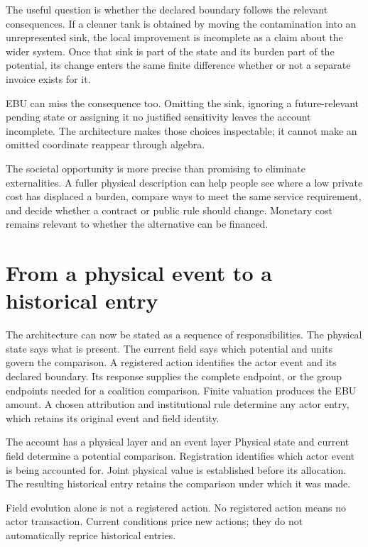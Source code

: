 The useful question is whether the declared boundary follows the relevant consequences. If a cleaner tank is obtained by moving the contamination into an unrepresented sink, the local improvement is incomplete as a claim about the wider system. Once that sink is part of the state and its burden part of the potential, its change enters the same finite difference whether or not a separate invoice exists for it.

EBU can miss the consequence too. Omitting the sink, ignoring a future-relevant pending state or assigning it no justified sensitivity leaves the account incomplete. The architecture makes those choices inspectable; it cannot make an omitted coordinate reappear through algebra.

The societal opportunity is more precise than promising to eliminate externalities. A fuller physical description can help people see where a low private cost has displaced a burden, compare ways to meet the same service requirement, and decide whether a contract or public rule should change. Monetary cost remains relevant to whether the alternative can be financed.

\section{From a physical event to a historical entry}
The architecture can now be stated as a sequence of responsibilities. The physical state says what is present. The current field says which potential and units govern the comparison. A registered action identifies the actor event and its declared boundary. Its response supplies the complete endpoint, or the group endpoints needed for a coalition comparison. Finite valuation produces the EBU amount. A chosen attribution and institutional rule determine any actor entry, which retains its original event and field identity.

\begin{lawbox}{The account has a physical layer and an event layer}
Physical state and current field determine a potential comparison. Registration identifies which actor event is being accounted for. Joint physical value is established before its allocation. The resulting historical entry retains the comparison under which it was made.

Field evolution alone is not a registered action. No registered action means no actor transaction. Current conditions price new actions; they do not automatically reprice historical entries.
\end{lawbox}

